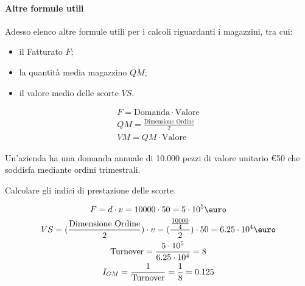 \paragraph{Altre formule utili} Adesso elenco altre formule utili per i calcoli riguardanti i magazzini, tra cui:
\begin{itemize}
    \item il Fatturato $ F $;
    \item la quantità media magazzino $ QM $;
    \item il valore medio delle scorte $ VS $.
\end{itemize}
\begin{gather*}
    F = \text{Domanda} \cdot \text{Valore}                            \\
    QM = \frac{\text{Dimensione Ordine}}{2} \\
    VM = QM \cdot \text{Valore}
\end{gather*}

\begin{example}
    Un'azienda ha una domanda annuale di 10.000 pezzi di valore unitario \euro{50} che soddisfa mediante ordini trimestrali.

    Calcolare gli indici di prestazione delle scorte.

    \begin{gather*}
        F = d \cdot v = 10000 \cdot 50 = 5 \cdot 10^{5} \text{\euro} \\
        VS = (\frac{\text{Dimensione Ordine}}{2}) \cdot v = (\frac{\frac{10000}{4}}{2}) \cdot 50 = 6.25 \cdot 10^{4} \text{\euro} \\
        \text{Turnover} = \frac{5 \cdot 10^{5}}{6.25 \cdot 10^{4}}= 8 \\
        I_{GM} = \frac{1}{\text{Turnover}} = \frac{1}{8} = 0.125
    \end{gather*}
\end{example}

%
